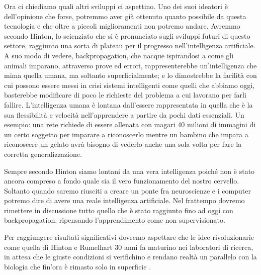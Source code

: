 \documentclass [12pt,oneside,a4paper,openany]{book}
\begin{document}
Ora ci chiediamo quali altri sviluppi ci aspettino. Uno dei suoi ideatori è dell'opinione che forse, potremmo aver già ottenuto quanto possibile da questa tecnologia e che oltre a piccoli miglioramenti non potremo andare. Avremmo secondo Hinton, lo scienziato che si è pronunciato sugli sviluppi futuri di questo settore, raggiunto una sorta di plateau per il progresso nell'intelligenza artificiale. A suo modo di vedere, backpropagation, che nacque ispirandosi a come gli animali imparano, attraverso prove ed errori, rappresenterebbe un'intelligenza che mima quella umana, ma soltanto superficialmente; e lo dimostrebbe la facilità con cui possono essere messi in crisi sistemi intelligenti come quelli che abbiamo oggi, basterebbe modificare di poco le richieste del problema a cui lavorano per farli fallire. L'intelligenza umana è lontana dall'essere rappresentata in quella che è la sua flessibilità e velocità nell'apprendere a partire da pochi dati essenziali. Un esempio: una rete richiede di essere allenata con magari 40 milioni di immagini di un certo soggetto per imparare a riconoscerlo mentre un bambino che impara a riconoscere un gelato avrà bisogno di vederlo anche una sola volta per fare la corretta generalizzazione. 

Sempre secondo Hinton siamo lontani da una vera intelligenza poiché non è stato ancora compreso a fondo quale sia il vero funzionamento del nostro cervello. Soltanto quando saremo riusciti a creare un ponte fra neuroscienze e i computer potremo dire di avere una reale intelligenza artificiale. Nel frattempo dovremo rimettere in discussione tutto quello che è stato raggiunto fino ad oggi con backpropagation, ripensando l'apprendimento come non supervisionato.

Per raggiungere risultati significativi dovremo aspettare che le idee rivoluzionarie come quella di Hinton e Rumelhart 30 anni fa maturino nei laboratori di ricerca, in attesa che le giuste condizioni si verifichino e rendano realtà un parallelo con la biologia che fin'ora è rimasto solo in superficie \cite{mit-ai}. 



\end{document}
